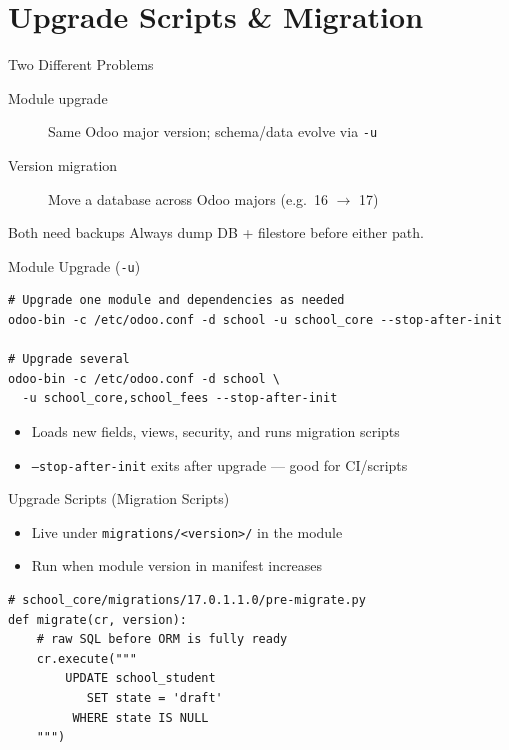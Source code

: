 \section{Upgrade Scripts \& Migration}

\begin{frame}{Two Different Problems}
\begin{description}
  \item[Module upgrade] Same Odoo major version; schema/data evolve via \texttt{-u}
  \item[Version migration] Move a database across Odoo majors (e.g.\ 16 $\rightarrow$ 17)
\end{description}

\vspace{0.6em}
\begin{block}{Both need backups}
  Always dump DB + filestore before either path.
\end{block}
\end{frame}

\begin{frame}[fragile]{Module Upgrade (\texttt{-u})}
\begin{lstlisting}[style=bash]
# Upgrade one module and dependencies as needed
odoo-bin -c /etc/odoo.conf -d school -u school_core --stop-after-init

# Upgrade several
odoo-bin -c /etc/odoo.conf -d school \
  -u school_core,school_fees --stop-after-init
\end{lstlisting}

\vspace{0.4em}
\begin{itemize}
  \item Loads new fields, views, security, and runs migration scripts
  \item \texttt{--stop-after-init} exits after upgrade --- good for CI/scripts
\end{itemize}
\end{frame}

\begin{frame}[fragile]{Upgrade Scripts (Migration Scripts)}
\begin{itemize}
  \item Live under \texttt{migrations/<version>/} in the module
  \item Run when module version in manifest increases
\end{itemize}

\vspace{0.4em}
\begin{lstlisting}
# school_core/migrations/17.0.1.1.0/pre-migrate.py
def migrate(cr, version):
    # raw SQL before ORM is fully ready
    cr.execute("""
        UPDATE school_student
           SET state = 'draft'
         WHERE state IS NULL
    """)
\end{lstlisting}
\end{frame}

